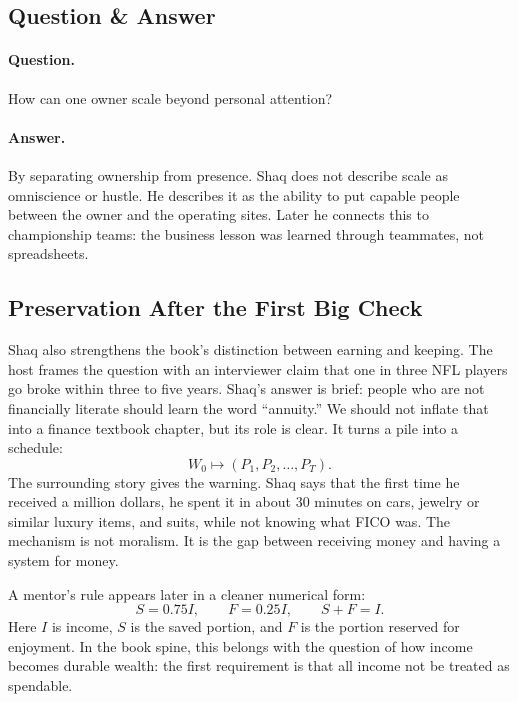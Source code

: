 \documentclass[11pt,oneside]{book}
\begin{document}
\subsection{Question \& Answer}

\paragraph{Question.}
How can one owner scale beyond personal attention?

\paragraph{Answer.}
By separating ownership from presence. Shaq does not describe scale as omniscience or hustle. He describes it as the ability to put capable people between the owner and the operating sites. Later he connects this to championship teams: the business lesson was learned through teammates, not spreadsheets.

\subsection{Preservation After the First Big Check}

Shaq also strengthens the book's distinction between earning and keeping. The host frames the question with an interviewer claim that one in three NFL players go broke within three to five years. Shaq's answer is brief: people who are not financially literate should learn the word ``annuity.'' We should not inflate that into a finance textbook chapter, but its role is clear. It turns a pile into a schedule:
\begin{equation}
W_0\longmapsto (P_1,P_2,\ldots,P_T).
\end{equation}
The surrounding story gives the warning. Shaq says that the first time he received a million dollars, he spent it in about 30 minutes on cars, jewelry or similar luxury items, and suits, while not knowing what FICO was. The mechanism is not moralism. It is the gap between receiving money and having a system for money.

A mentor's rule appears later in a cleaner numerical form:
\begin{equation}
S=0.75I,\qquad F=0.25I,\qquad S+F=I.
\end{equation}
Here \(I\) is income, \(S\) is the saved portion, and \(F\) is the portion reserved for enjoyment. In the book spine, this belongs with the question of how income becomes durable wealth: the first requirement is that all income not be treated as spendable.
\end{document}
